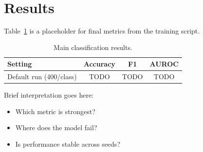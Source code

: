 \section{Results}

Table~\ref{tab:main-results} is a placeholder for final metrics from the
training script.

\begin{table}[t]
\centering
\begin{tabular}{lccc}
\toprule
Setting & Accuracy & F1 & AUROC \\
\midrule
Default run (400/class) & TODO & TODO & TODO \\
\bottomrule
\end{tabular}
\caption{Main classification results.}
\label{tab:main-results}
\end{table}

Brief interpretation goes here:
\begin{itemize}
  \item Which metric is strongest?
  \item Where does the model fail?
  \item Is performance stable across seeds?
\end{itemize}
